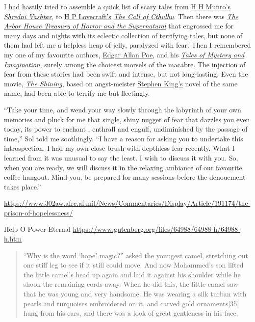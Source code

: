 \documentclass[
  a4paper,
]{article}
\begin{document}
I had hastily tried to assemble a quick list of scary tales from
\href{https://americanliterature.com/author/hh-munro-saki}{H H Munro's}
\href{https://www.classicshorts.com/stories/vashtar.html}{\emph{Shredni
Vashtar}}, to \href{https://www.hplovecraft.com/}{H P Lovecraft's}
\href{https://www.hplovecraft.com/writings/texts/fiction/cc.aspx}{\emph{The
Call of Cthulhu}}. Then there was
\href{https://openlibrary.org/books/OL4122966M/The_Arbor_House_treasury_of_horror_and_the_supernatural}{\emph{The
Arbor House Treasury of Horror and the Supernatural}} that engrossed me
for many days and nights with its eclectic collection of terrifying
tales, but none of them had left me a helpless heap of jelly, paralyzed
with fear. Then I remembered my one of my favourite authors,
\href{https://www.poetryfoundation.org/poets/edgar-allan-poe}{Edgar
Allan Poe}, and his
\href{https://www.amazon.in/Tales-Mystery-Imagination-Collins-Classics/dp/0007420226}{\emph{Tales
of Mystery and Imagination}}, surely among the choicest morsels of the
macabre. The injection of fear from these stories had been swift and
intense, but not long-lasting. Even the movie,
\href{https://www.imdb.com/title/tt0081505/}{\emph{The Shining}}, based
on angst-meister
\href{https://www.britannica.com/biography/Stephen-King}{Stephen King's}
novel of the same name, had been able to terrify me but fleetingly.

``Take your time, and wend your way slowly through the labyrinth of your
own memories and pluck for me that single, shiny nugget of fear that
dazzles you even today, its power to enchant , enthrall and engulf,
undiminished by the passage of time,'' Sol told me soothingly. ``I have
a reason for asking you to undertake this introspection. I had my own
close brush with depthless fear recently. What I learned from it was
unusual to say the least. I wish to discuss it with you. So, when you
are ready, we will discuss it in the relaxing ambiance of our favourite
coffee hangout. Mind you, be prepared for many sessions before the
denouement takes place.''

\url{https://www.302aw.afrc.af.mil/News/Commentaries/Display/Article/191174/the-prison-of-hopelessness/}

Help O Power Eternal
\url{https://www.gutenberg.org/files/64988/64988-h/64988-h.htm}

\begin{quote}
``Why is the word `hope' magic?'' asked the youngest camel, stretching
out one stiff leg to see if it still could move. And now Mohammed's son
lifted the little camel's head up again and laid it against his shoulder
while he shook the remaining cords away. When he did this, the little
camel saw that he was young and very handsome. He was wearing a silk
turban with pearls and turquoises embroidered on it, and carved gold
ornaments{[}35{]} hung from his ears, and there was a look of great
gentleness in his face.
\end{quote}
\end{document}
